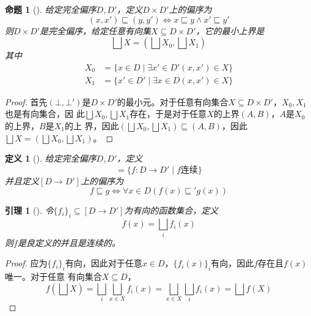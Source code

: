 \documentclass[11pt]{article}
\newtheorem{proposition}[theorem]{命题}
\newtheorem{lemma}[theorem]{引理}
\newtheorem{definition}[theorem]{定义}
\begin{document}
\begin{proposition}[]
给定完全偏序\(D,D'\)，定义\(D\times D'\)上的偏序为
\begin{equation*}
(x,x')\sqsubseteq(y,y')\Leftrightarrow x\sqsubseteq y\wedge x'\sqsubseteq y'
\end{equation*}
则\(D\times D'\)是完全偏序，给定任意有向集\(X\subseteq D\times D'\)，它的最小上界是
\begin{equation*}
\bigsqcup X=(\bigsqcup X_0,\bigsqcup X_1)
\end{equation*}
其中
\begin{align*}
X_0&=\{x\in D\mid\exists x'\in  D'(x,x')\in X\}\\
X_1&=\{x'\in D'\mid\exists x\in D(x,x')\in X\}
\end{align*}
\end{proposition}

\begin{proof}
首先\((\bot,\bot')\)是\(D\times D'\)的最小元。对于任意有向集合\(X\subseteq D\times D'\)，\(X_0,X_1\)也是有向集合，因
此\(\bigsqcup X_0,\bigsqcup X_1\)存在，于是对于任意\(X\)的上界\((A,B)\)，\(A\)是\(X_0\)的上界，\(B\)是\(X_1\)的上
界，因此\((\bigsqcup X_0,\bigsqcup X_1)\sqsubseteq(A,B)\)，因此\(\bigsqcup X=(\bigsqcup X_0,\bigsqcup X_1)\)。
\end{proof}


\begin{definition}[]
给定完全偏序\(D,D'\)，定义
\begin{equation*}
[D\to D']=\{f:D\to D'\mid f\text{连续}\}
\end{equation*}
并且定义\([D\to D']\)上的偏序为
\begin{equation*}
f\sqsubseteq g\Leftrightarrow\forall x\in D(f(x)\sqsubseteq'g(x))
\end{equation*}
\end{definition}

\begin{lemma}[]
\label{1.2.10}
令\(\{f_i\}_i\subseteq[D\to D']\)为有向的函数集合，定义
\begin{equation*}
f(x)=\bigsqcup_if_i(x)
\end{equation*}
则\(f\)是良定义的并且是连续的。
\end{lemma}

\begin{proof}
应为\(\{f_i\}_i\)有向，因此对于任意\(x\in D\)，\(\{f_i(x)\}_i\)有向，因此\(f\)存在且\(f(x)\)唯一。对于任意
有向集合\(X\subseteq D\)，
\begin{equation*}
f(\bigsqcup X)=\bigsqcup_i\bigsqcup_{x\in X}f_i(x)=\bigsqcup_{x\in X}\bigsqcup_if_i(x)=\bigsqcup f(X)
\end{equation*}
\end{proof}
\end{document}
